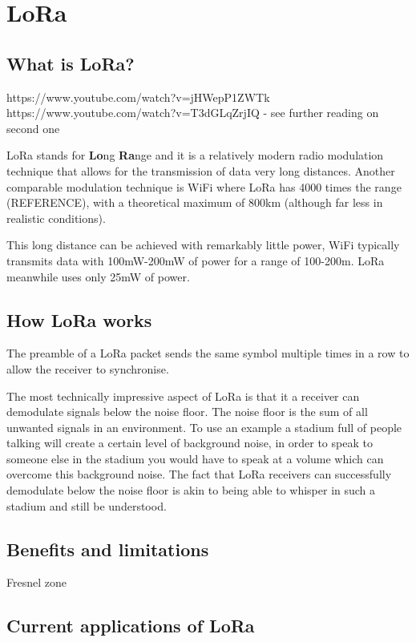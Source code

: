\section{LoRa}

\subsection{What is LoRa?}

https://www.youtube.com/watch?v=jHWepP1ZWTk
https://www.youtube.com/watch?v=T3dGLqZrjIQ
- see further reading on second one

LoRa stands for \textbf{Lo}ng \textbf{Ra}nge and it is a relatively modern radio
modulation technique that allows for the transmission of data very long
distances. Another comparable modulation technique is WiFi where LoRa has 4000
times the range (REFERENCE), with a theoretical maximum of 800km (although far
less in realistic conditions). 

This long distance can be achieved with remarkably little power, WiFi typically
transmits data with 100mW-200mW of power for a range of 100-200m. LoRa meanwhile
uses only 25mW of power.

\subsection{How LoRa works}

The preamble of a LoRa packet sends the same symbol multiple times in a row to
allow the receiver to synchronise.

The most technically impressive aspect of LoRa is that it a receiver can
demodulate signals below the noise floor. The noise floor is the sum of all
unwanted signals in an environment. To use an example a stadium full of people
talking will create a certain level of background noise, in order to speak to
someone else in the stadium you would have to speak at a volume which can
overcome this background noise. The fact that LoRa receivers can successfully
demodulate below the noise floor is akin to being able to whisper in such a
stadium and still be understood.

\subsection{Benefits and limitations}

Fresnel zone


\subsection{Current applications of LoRa}